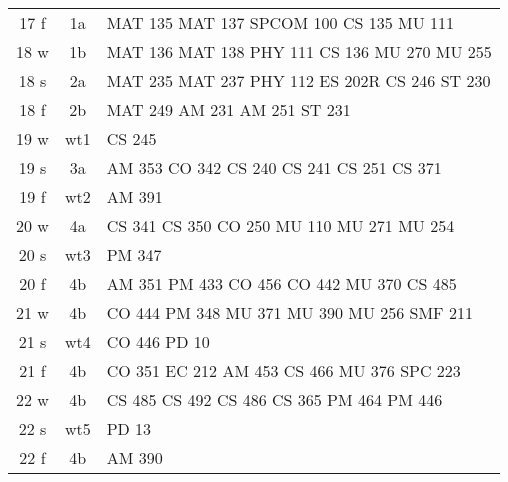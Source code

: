 \documentclass[convert]{standalone}
\newcommand{\opt}[1]{{\color{gray!50}#1}}
\begin{document}
\begin{tabular}{|c | c | l |}
	\hline
	17 f & 1a & MAT 135 \quad MAT 137 \quad SPCOM 100 \quad CS 135 \quad MU 111 \\
	18 w & 1b & MAT 136 \quad MAT 138 \quad PHY 111 \quad CS 136 \quad MU 270 \quad MU 255\\
	18 s & 2a & MAT 235 \quad MAT 237 \quad PHY 112 \quad ES 202R \quad CS 246 \quad ST  230 \\
	18 f & 2b & MAT 249 \quad AM 231 \quad AM 251 \quad ST  231 \\
	19 w & wt1 & CS 245 \\
	19 s & 3a & AM 353 \quad CO 342 \quad CS 240 \quad CS 241 \quad CS 251 \quad CS 371 \\
	19 f & wt2 & AM 391 \\
	20 w & 4a & CS 341 \quad CS 350 \quad CO 250  \quad MU 110 \quad MU 271 \quad MU 254 \\
	20 s & wt3 & PM 347 \\
	20 f & 4b & AM 351  \quad PM 433  \quad CO 456 \quad CO 442  \quad MU 370 \quad CS 485 \\
	21 w & 4b & CO 444 \quad PM 348   \quad MU 371   \quad MU 390 \quad MU 256 \quad SMF 211 \\
	21 s & wt4 & CO 446 \quad PD 10  \\
	21 f & 4b &{\color{white} CO 351} \quad EC 212  \quad AM 453 \quad CS 466 \quad MU 376 \quad SPC 223    \\
	22 w & 4b & \opt{CS 485} \quad CS 492 \quad CS 486 \quad CS 365 \quad PM 464 \quad PM 446     \\
	22 s & wt5 & PD 13 \\
	22 f & 4b &  AM 390   \\\hline

\end{tabular}
\end{document}
